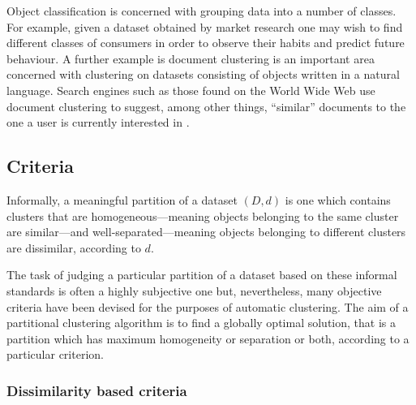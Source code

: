 Object classification is concerned with grouping data into a number of
classes.  For example, given a dataset obtained by market research one may
wish to find different classes of consumers in order to observe their habits
and predict future behaviour.  A further example is document clustering is an
important area concerned with clustering on datasets consisting of objects
written in a natural language.  Search engines such as those found on the
World Wide Web use document clustering to suggest, among other things,
``similar'' documents to the one a user is currently interested in
\citep{steinbach2000comparison}.

\subsection{Criteria}
\label{sec:criteria}

Informally, a meaningful partition of a dataset $(D,d)$ is one which contains
clusters that are homogeneous---meaning objects belonging to the same cluster
are similar---and well-separated---meaning objects belonging to different
clusters are dissimilar, according to $d$.

The task of judging a particular partition of a dataset based on these
informal standards is often a highly subjective one but, nevertheless, many
objective criteria have been devised for the purposes of automatic clustering.
The aim of a partitional clustering algorithm is to find a globally optimal
solution, that is a partition which has maximum homogeneity or separation or
both, according to a particular criterion.

\subsubsection{Dissimilarity based criteria}
\label{sec:diss-based-crit}

